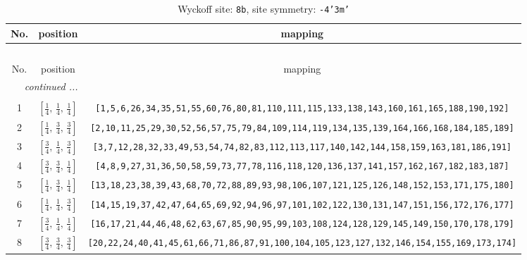 \documentclass[fleqn,8pt]{jsarticle}
\begin{document}
\renewcommand{\arraystretch}{1.2}
\begin{longtable}{ccc}
\caption{Wyckoff site: {\tt 8b}, site symmetry: {\tt -4'3m'}}
 \\
 \hline \hline
No. & position & mapping \\ \hline \endfirsthead

\multicolumn{2}{l}{\tablename\ \thetable{}} \\
 \hline \hline
No. & position & mapping \\ \hline \endhead

 \hline \hline
\multicolumn{2}{r}{\footnotesize\it continued ...} \\ \endfoot

 \hline \hline
\multicolumn{2}{r}{} \\ \endlastfoot

1 & $\left[ \frac{1}{4},\, \frac{1}{4},\, \frac{1}{4} \right]$ & {\tt [1,5,6,26,34,35,51,55,60,76,80,81,110,111,115,133,138,143,160,161,165,188,190,192]} \\ \hline
2 & $\left[ \frac{1}{4},\, \frac{3}{4},\, \frac{3}{4} \right]$ & {\tt [2,10,11,25,29,30,52,56,57,75,79,84,109,114,119,134,135,139,164,166,168,184,185,189]} \\ \hline
3 & $\left[ \frac{3}{4},\, \frac{1}{4},\, \frac{3}{4} \right]$ & {\tt [3,7,12,28,32,33,49,53,54,74,82,83,112,113,117,140,142,144,158,159,163,181,186,191]} \\ \hline
4 & $\left[ \frac{3}{4},\, \frac{3}{4},\, \frac{1}{4} \right]$ & {\tt [4,8,9,27,31,36,50,58,59,73,77,78,116,118,120,136,137,141,157,162,167,182,183,187]} \\ \hline
5 & $\left[ \frac{1}{4},\, \frac{3}{4},\, \frac{1}{4} \right]$ & {\tt [13,18,23,38,39,43,68,70,72,88,89,93,98,106,107,121,125,126,148,152,153,171,175,180]} \\ \hline
6 & $\left[ \frac{1}{4},\, \frac{1}{4},\, \frac{3}{4} \right]$ & {\tt [14,15,19,37,42,47,64,65,69,92,94,96,97,101,102,122,130,131,147,151,156,172,176,177]} \\ \hline
7 & $\left[ \frac{3}{4},\, \frac{1}{4},\, \frac{1}{4} \right]$ & {\tt [16,17,21,44,46,48,62,63,67,85,90,95,99,103,108,124,128,129,145,149,150,170,178,179]} \\ \hline
8 & $\left[ \frac{3}{4},\, \frac{3}{4},\, \frac{3}{4} \right]$ & {\tt [20,22,24,40,41,45,61,66,71,86,87,91,100,104,105,123,127,132,146,154,155,169,173,174]} \\
\end{longtable}
\renewcommand{\arraystretch}{1.2}
\end{document}

